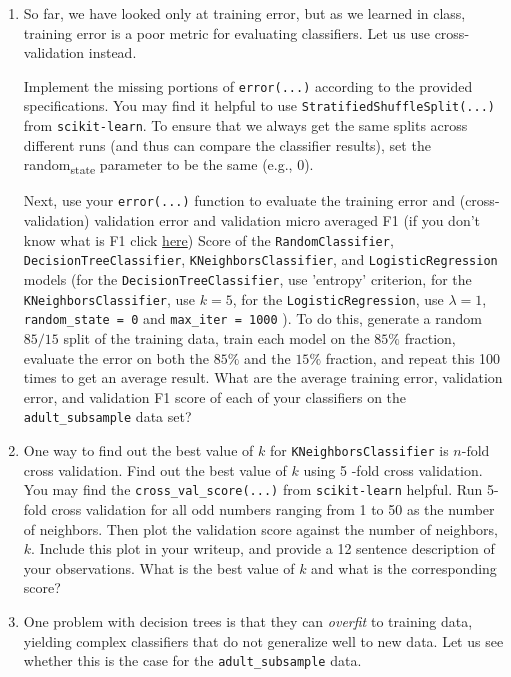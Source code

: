 \documentclass[letterpaper]{article}
\theoremstyle{definition}
\begin{document}
\begin{enumerate}
\begin{enumerate}
\item So far, we have looked only at training error, but as we learned
in class, training error is a poor metric for evaluating
classifiers. Let us use cross-validation instead.

Implement the missing portions of \texttt{error(...)} according to the
provided specifications. You may find it helpful to use
\texttt{StratifiedShuffleSplit(...)} from \texttt{scikit-learn}. To ensure
that we always get the same splits across different runs (and
thus can compare the classifier results), set the random\textsubscript{state}
parameter to be the same (e.g., 0).

Next, use your \texttt{error(...)} function to evaluate the training
error and (cross-validation) validation error and validation
micro averaged F1 (if you don't know what is F1 click
\href{https://scikit-learn.org/stable/modules/generated/sklearn.metrics.f1_score.html?highlight=f1%20score#sklearn.metrics.f1_score}{here})
Score of the \texttt{RandomClassifier}, \texttt{DecisionTreeClassifier},
\texttt{KNeighborsClassifier}, and \texttt{LogisticRegression} models (for the
\texttt{DecisionTreeClassifier}, use 'entropy' criterion, for the \\[0pt]
\texttt{KNeighborsClassifier}, use \(k=5\), for the \texttt{LogisticRegression},
use \(\lambda=1\), \texttt{random\_state = 0} and \texttt{max\_iter = 1000} ). To
do this, generate a random \(85 / 15\) split of the training data,
train each model on the \(85 \%\) fraction, evaluate the error on
both the \(85 \%\) and the \(15 \%\) fraction, and repeat this 100
times to get an average result. What are the average training
error, validation error, and validation F1 score of each of your
classifiers on the \texttt{adult\_subsample} data set?

\item One way to find out the best value of \(k\) for
\texttt{KNeighborsClassifier} is \(n\text{-fold}\) cross validation. Find
out the best value of \(k\) using 5 -fold cross validation. You
may find the \texttt{cross\_val\_score(...)} from \texttt{scikit-learn} helpful.
Run 5-fold cross validation for all odd numbers ranging from 1
to 50 as the number of neighbors. Then plot the validation score
against the number of neighbors, \(k\). Include this plot in your
writeup, and provide a 12 sentence description of your
observations. What is the best value of \(k\) and what is the
corresponding score?

\item One problem with decision trees is that they can \emph{overfit} to
training data, yielding complex classifiers that do not
generalize well to new data. Let us see whether this is the case
for the \texttt{adult\_subsample} data.


\end{enumerate}
\end{enumerate}
\end{document}
